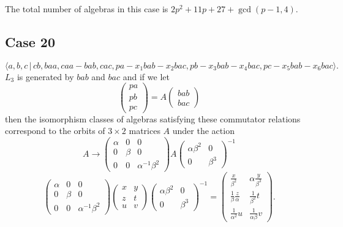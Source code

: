 \documentclass[10pt,thmsa]{article}
\begin{document}
The total number of algebras in this case is $2p^{2}+11p+27+\gcd (p-1,4)$.

\subsection{Case 20}

\[
\langle
a,b,c\,|%
\,cb,baa,caa-bab,cac,pa-x_{1}bab-x_{2}bac,pb-x_{3}bab-x_{4}bac,pc-x_{5}bab-x_{6}bac\rangle . 
\]%
$L_{3}$ is generated by $bab$ and $bac$ and if we let 
\[
\left( 
\begin{array}{l}
pa \\ 
pb \\ 
pc%
\end{array}%
\right) =A\left( 
\begin{array}{l}
bab \\ 
bac%
\end{array}%
\right) 
\]%
then the isomorphism classes of algebras satisfying these commutator
relations correspond to the orbits of $3\times 2$ matrices $A$ under the
action 
\[
A\rightarrow \left( 
\begin{array}{lll}
\alpha & 0 & 0 \\ 
0 & \beta & 0 \\ 
0 & 0 & \alpha ^{-1}\beta ^{2}%
\end{array}%
\right) A\left( 
\begin{array}{ll}
\alpha \beta ^{2} & 0 \\ 
0 & \beta ^{3}%
\end{array}%
\right) ^{-1} 
\]%
\[
\left( 
\begin{array}{lll}
\alpha & 0 & 0 \\ 
0 & \beta & 0 \\ 
0 & 0 & \alpha ^{-1}\beta ^{2}%
\end{array}%
\right) \left( 
\begin{array}{ll}
x & y \\ 
z & t \\ 
u & v%
\end{array}%
\right) \left( 
\begin{array}{ll}
\alpha \beta ^{2} & 0 \\ 
0 & \beta ^{3}%
\end{array}%
\right) ^{-1}=\allowbreak \left( 
\begin{array}{cc}
\frac{x}{\beta ^{2}} & \alpha \frac{y}{\beta ^{3}} \\ 
\frac{1}{\beta }\frac{z}{\alpha } & \frac{1}{\beta ^{2}}t \\ 
\frac{1}{\alpha ^{2}}u & \frac{1}{\alpha \beta }v%
\end{array}%
\right) . 
\]
\end{document}
